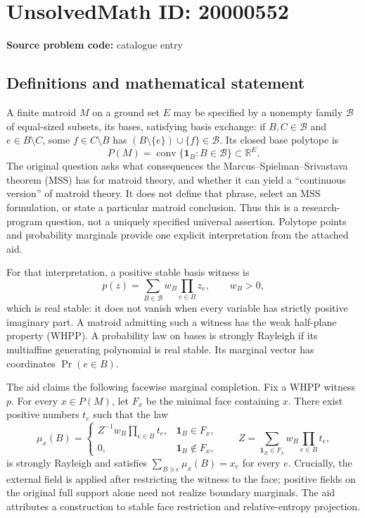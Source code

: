 \documentclass[11pt]{article}
\newcommand{\R}{\mathbb{R}}
\begin{document}
\section*{UnsolvedMath ID: 20000552}
\textbf{Source problem code:} catalogue entry
\subsection{Definitions and mathematical statement}
A finite matroid \(M\) on a ground set \(E\) may be specified by a nonempty family \(\mathcal B\) of equal-sized subsets, its bases, satisfying basis exchange: if \(B,C\in\mathcal B\) and \(e\in B\setminus C\), some \(f\in C\setminus B\) has \((B\setminus\{e\})\cup\{f\}\in\mathcal B\). Its closed base polytope is
\[
P(M)=\operatorname{conv}\{\mathbf1_B:B\in\mathcal B\}\subset\R^E.
\]
The original question asks what consequences the Marcus--Spielman--Srivastava theorem (MSS) has for matroid theory, and whether it can yield a ``continuous version'' of matroid theory. It does not define that phrase, select an MSS formulation, or state a particular matroid conclusion. Thus this is a research-program question, not a uniquely specified universal assertion. Polytope points and probability marginals provide one explicit interpretation from the attached aid.

For that interpretation, a positive stable basis witness is
\[
p(z)=\sum_{B\in\mathcal B}w_B\prod_{e\in B}z_e,\qquad w_B>0,
\]
which is real stable: it does not vanish when every variable has strictly positive imaginary part. A matroid admitting such a witness has the weak half-plane property (WHPP). A probability law on bases is strongly Rayleigh if its multiaffine generating polynomial is real stable. Its marginal vector has coordinates \(\Pr(e\in B)\).

The aid claims the following facewise marginal completion. Fix a WHPP witness \(p\). For every \(x\in P(M)\), let \(F_x\) be the minimal face containing \(x\). There exist positive numbers \(t_e\) such that the law
\[
\mu_x(B)=\begin{cases}
Z^{-1}w_B\prod_{e\in B}t_e,&\mathbf1_B\in F_x,\\
0,&\mathbf1_B\notin F_x,
\end{cases}
\qquad
Z=\sum_{\mathbf1_B\in F_x}w_B\prod_{e\in B}t_e,
\]
is strongly Rayleigh and satisfies \(\sum_{B\ni e}\mu_x(B)=x_e\) for every \(e\). Crucially, the external field is applied after restricting the witness to the face; positive fields on the original full support alone need not realize boundary marginals. The aid attributes a construction to stable face restriction and relative-entropy projection.
\end{document}
